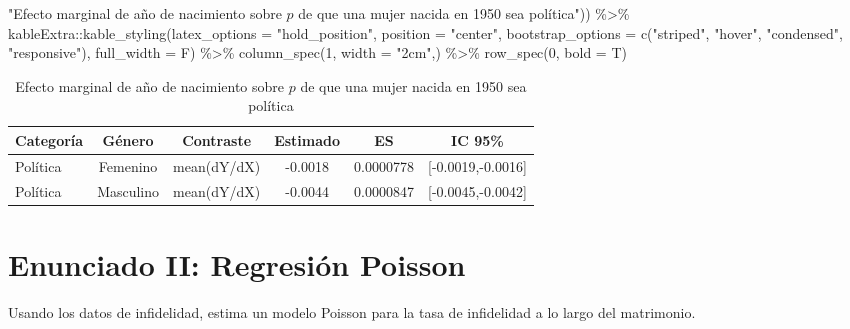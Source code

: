 \documentclass[
  12pt,
  a4paper,
]{article}
\newenvironment{Shaded}{\begin{snugshade}}{\end{snugshade}}
\newcommand{\AttributeTok}[1]{\textcolor[rgb]{0.77,0.63,0.00}{#1}}
\newcommand{\DecValTok}[1]{\textcolor[rgb]{0.00,0.00,0.81}{#1}}
\newcommand{\FunctionTok}[1]{\textcolor[rgb]{0.00,0.00,0.00}{#1}}
\newcommand{\NormalTok}[1]{#1}
\newcommand{\SpecialCharTok}[1]{\textcolor[rgb]{0.00,0.00,0.00}{#1}}
\newcommand{\StringTok}[1]{\textcolor[rgb]{0.31,0.60,0.02}{#1}}
\begin{document}
\begin{Shaded}
\begin{Highlighting}[]
                                    \StringTok{"Efecto marginal de año de nacimiento sobre $p$ de que una mujer nacida en 1950 sea política"}\NormalTok{)) }\SpecialCharTok{\%\textgreater{}\%} 
\NormalTok{  kableExtra}\SpecialCharTok{::}\FunctionTok{kable\_styling}\NormalTok{(}\AttributeTok{latex\_options =} \StringTok{"hold\_position"}\NormalTok{, }
                            \AttributeTok{position =} \StringTok{"center"}\NormalTok{, }
                            \AttributeTok{bootstrap\_options =} \FunctionTok{c}\NormalTok{(}\StringTok{"striped"}\NormalTok{, }\StringTok{"hover"}\NormalTok{, }
                                                  \StringTok{"condensed"}\NormalTok{, }\StringTok{"responsive"}\NormalTok{), }
                            \AttributeTok{full\_width =}\NormalTok{ F) }\SpecialCharTok{\%\textgreater{}\%} 
  \FunctionTok{column\_spec}\NormalTok{(}\DecValTok{1}\NormalTok{, }\AttributeTok{width =} \StringTok{"2cm"}\NormalTok{,) }\SpecialCharTok{\%\textgreater{}\%}
  \FunctionTok{row\_spec}\NormalTok{(}\DecValTok{0}\NormalTok{, }\AttributeTok{bold =}\NormalTok{ T)}
\end{Highlighting}
\end{Shaded}

\begin{table}[!h]

\caption{\label{tab:table1}\label{tab:table1} Efecto marginal de año de nacimiento sobre $p$ de que una mujer nacida en 1950 sea política}
\centering
\begin{tabular}[t]{>{\centering\arraybackslash}p{2cm}ccccc}
\toprule
\textbf{Categoría} & \textbf{Género} & \textbf{Contraste} & \textbf{Estimado} & \textbf{ES} & \textbf{IC 95\%}\\
\midrule
Política & Femenino & mean(dY/dX) & -0.0018 & 0.0000778 & {}[-0.0019,-0.0016]\\
Política & Masculino & mean(dY/dX) & -0.0044 & 0.0000847 & {}[-0.0045,-0.0042]\\
\bottomrule
\end{tabular}
\end{table}

\hypertarget{enunciado-ii-regresiuxf3n-poisson}{%
\section{Enunciado II: Regresión Poisson}\label{enunciado-ii-regresiuxf3n-poisson}}

Usando los datos de infidelidad, estima un modelo Poisson para la tasa de infidelidad a lo largo del matrimonio.
\end{document}
